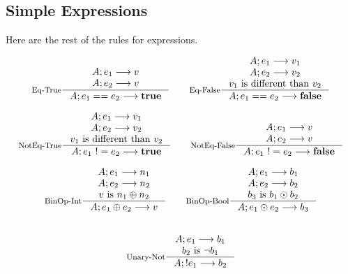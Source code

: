 \documentclass[10pt]{article}
\begin{document}
\subsection{Simple Expressions}
Here are the rest of the rules for expressions.

$$
\begin{array}{c}

\inference[Eq-True]
{\config{e_1} --> v \\
\config{e_2} --> v}
{\config{e_1 == e_2} --> \mathbf{true}}

\qquad

\inference[Eq-False]
{\config{e_1} --> v_1 \\
\config{e_2} --> v_2 \\
v_1 \mathrm{~is~different\ than~} v_2}
{\config{e_1 == e_2} --> \mathbf{false}}

\\ \\

\inference[NotEq-True]
{\config{e_1} --> v_1 \\
\config{e_2} --> v_2 \\
v_1 \mathrm{~is~different\ than~} v_2}
{\config{e_1\ != e_2} --> \mathbf{true}}

\qquad

\inference[NotEq-False]
{\config{e_1} --> v \\
\config{e_2} --> v}
{\config{e_1\ != e_2} --> \mathbf{false}}

\\ \\

\inference[BinOp-Int]
{\config{e_1} --> n_1 \\
\config{e_2} --> n_2 \\
v \mathrm{~is~} n_1 \oplus n_2}
{\config{e_1 \oplus e_2} --> v}

\qquad

\inference[BinOp-Bool]
{\config{e_1} --> b_1 \\
\config{e_2} --> b_2 \\
b_3 \mathrm{~is~} b_1 \odot  b_2}
{\config{e_1 \odot e_2} --> b_3}

\\ \\ \\

\inference[Unary-Not]
{\config{e_1} --> b_1 \\
b_2 \mathrm{~is~} \neg b_1}
{\config{! e_1} --> b_2}

\\ \\ \\
\end{array}
$$
\end{document}

